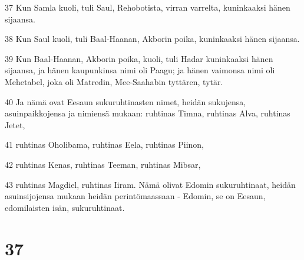 \par 37 Kun Samla kuoli, tuli Saul, Rehobotista, virran varrelta, kuninkaaksi hänen sijaansa.
\par 38 Kun Saul kuoli, tuli Baal-Haanan, Akborin poika, kuninkaaksi hänen sijaansa.
\par 39 Kun Baal-Haanan, Akborin poika, kuoli, tuli Hadar kuninkaaksi hänen sijaansa, ja hänen kaupunkinsa nimi oli Paagu; ja hänen vaimonsa nimi oli Mehetabel, joka oli Matredin, Mee-Saahabin tyttären, tytär.
\par 40 Ja nämä ovat Eesaun sukuruhtinasten nimet, heidän sukujensa, asuinpaikkojensa ja nimiensä mukaan: ruhtinas Timna, ruhtinas Alva, ruhtinas Jetet,
\par 41 ruhtinas Oholibama, ruhtinas Eela, ruhtinas Piinon,
\par 42 ruhtinas Kenas, ruhtinas Teeman, ruhtinas Mibsar,
\par 43 ruhtinas Magdiel, ruhtinas Iiram. Nämä olivat Edomin sukuruhtinaat, heidän asuinsijojensa mukaan heidän perintömaassaan - Edomin, se on Eesaun, edomilaisten isän, sukuruhtinaat.

\chapter{37}

